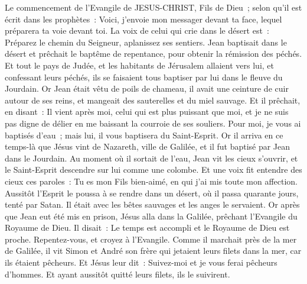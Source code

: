 \begin{multicols}{2}
\VerseOne{}Le commencement de l'Evangile de JESUS-CHRIST, Fils de Dieu~;
selon qu'il est écrit dans les prophètes~: Voici, j'envoie mon messager devant ta face, lequel préparera ta voie devant toi.
La voix de celui qui crie dans le désert est~: Préparez le chemin du Seigneur, aplanissez ses sentiers.
Jean baptisait dans le désert et prêchait le baptême de repentance, pour obtenir la rémission des péchés.
Et tout le pays de Judée, et les habitants de Jérusalem allaient vers lui, et confessant leurs péchés, ils se faisaient tous baptiser par lui dans le fleuve du Jourdain.
Or Jean était vêtu de poils de chameau, il avait une ceinture de cuir autour de ses reins, et mangeait des sauterelles et du miel sauvage.
Et il prêchait, en disant~: Il vient après moi, celui qui est plus puissant que moi, et je ne suis pas digne de délier en me baissant la courroie de ses souliers.
Pour moi, je vous ai baptisés d'eau~; mais lui, il vous baptisera du Saint-Esprit.
Or il arriva en ce temps-là que Jésus vint de Nazareth, ville de Galilée, et il fut baptisé par Jean dans le Jourdain.
Au moment où il sortait de l'eau, Jean vit les cieux s'ouvrir, et le Saint-Esprit descendre sur lui comme une colombe.
Et une voix fit entendre des cieux ces paroles~: Tu es mon Fils bien-aimé, en qui j'ai mis toute mon affection.
Aussitôt l'Esprit le poussa à se rendre dans un désert,
où il passa quarante jours, tenté par Satan. Il était avec les bêtes sauvages et les anges le servaient.
Or après que Jean eut été mis en prison, Jésus alla dans la Galilée, prêchant l'Evangile du Royaume de Dieu.
Il disait~: Le temps est accompli et le Royaume de Dieu est proche. Repentez-vous, et croyez à l'Evangile.
Comme il marchait près de la mer de Galilée, il vit Simon et André son frère qui jetaient leurs filets dans la mer, car ils étaient pêcheurs.
Et Jésus leur dit~: Suivez-moi et je vous ferai pêcheurs d'hommes.
Et ayant aussitôt quitté leurs filets, ils le suivirent.

\end{multicols}
